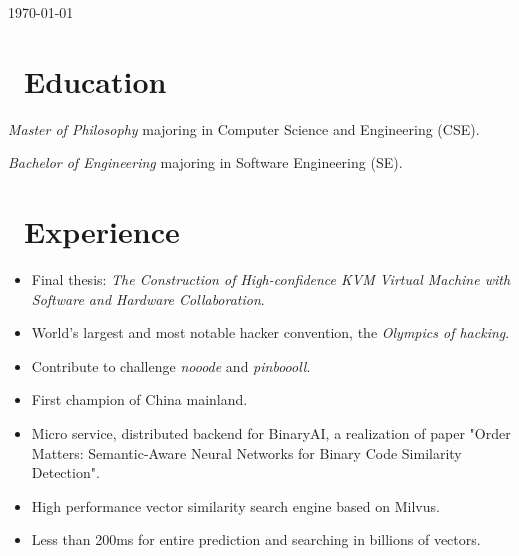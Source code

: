 \documentclass{resume}
\begin{document}
\today



\section{\faGraduationCap\ Education}
\textit{Master of Philosophy} majoring in Computer Science and Engineering (CSE).

\textit{Bachelor of Engineering} majoring in Software Engineering (SE).

\section{\faUsers\ Experience}
\begin{itemize}
    \item Final thesis: \textit{The Construction of High-confidence KVM Virtual Machine with Software and Hardware Collaboration}.
\end{itemize}

\begin{itemize}
    \item World's largest and most notable hacker convention, the \textit{Olympics of hacking}.
    \item Contribute to challenge \textit{nooode} and \textit{pinboooll}.
    \item First champion of China mainland.
\end{itemize}

\begin{itemize}
    \item Micro service, distributed backend for BinaryAI, a realization of paper "Order Matters: Semantic-Aware Neural Networks for Binary Code Similarity Detection".
    \item High performance vector similarity search engine based on Milvus.
    \item Less than 200ms for entire prediction and searching in billions of vectors.
\end{itemize}
\end{document}

